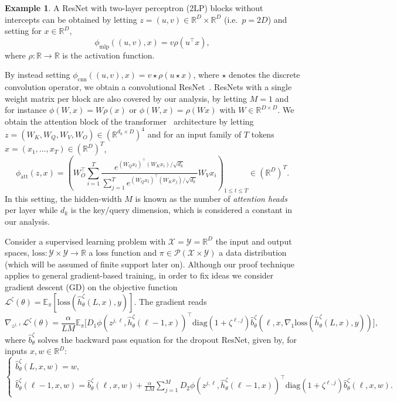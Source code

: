 \documentclass[a4paper,11pt]{article}
\newcommand{\R}{\mathbb{R}}
\newcommand{\1}{\mathbbm{1}}
\newcommand{\E}{\mathbb{E}}
\newcommand{\ps}{\mathcal{P}}
\renewcommand{\L}{\mathcal{L}}
\newcommand{\diag}{\mathrm{diag}}
\newcommand{\loss}{\mathrm{loss}}
\theoremstyle{definition}
\newtheorem{example}[theorem]{Example}
\theoremstyle{remark}
\begin{document}
\begin{example}\label{ex:classic_examples}
 A ResNet with two-layer perceptron (2LP) blocks without intercepts can be obtained by letting $z = (u,v) \in \R^D \times \R^D$ (i.e.~$p = 2D$) and setting for $x \in \R^D$, \[\phi_{\mathrm{mlp}}((u,v),x) = v \rho(u^\top x),\] where $\rho : \R \to \R$ is the activation function.
 
    By instead setting \(\phi_{\mathrm{cnn}}((u,v),x) = v \star \rho(u \star x)\), where $\star$ denotes the discrete convolution operator, we obtain a convolutional ResNet~\cite{he2015deepresiduallearningimage}.
    ResNets with a single weight matrix per block are also covered by our analysis, by letting $M = 1$ and for instance $\phi(W,x) = W \rho(x)$ or $\phi(W,x) = \rho(W x)$ with $W \in \R^{D \times D}$.
We obtain the attention block of the transformer~\cite{vaswani2017attention} architecture by letting $z = (W_K, W_Q, W_V, W_O) \in (\R^{d_k \times D})^4$ and for an input family of $T$ tokens $x = (x_1, \dots, x_T) \in (\R^D)^T$,
\begin{equation}
    \phi_{\mathrm{att}}(z,x) = \left( W_O^\top \sum_{i=1}^T \frac{e^{(W_Q x_t)^\top (W_K x_i)/\sqrt{d_k}}}{\sum_{j=1}^T e^{(W_Q x_t)^\top (W_K x_j)/\sqrt{d_k}}} W_V x_i \right)_{1 \le t \le T} \in (\R^D)^T.
\end{equation}
In this setting, the hidden-width $M$ is known as the number of \emph{attention heads} per layer while $d_k$ is the key/query dimension, which is considered a constant in our analysis.
\end{example}

Consider a supervised learning problem with
 $\mathcal{X}= \mathcal{Y} = \R^D$ the input and output spaces, $\loss: \mathcal{Y}\times\mathcal{Y} \to \R$ a loss function and $\pi\in \ps(\mathcal{X}\times\mathcal{Y})$ a data distribution (which will be assumed of finite support later on). 
Although our proof technique applies to general gradient-based training, in order to fix ideas we consider gradient descent (GD) on the objective function $\L^{\zeta}(\theta) = \E_{\pi}[\mathrm{loss}(\hat{h}_\theta^{\zeta}(L, x), y)]$. The gradient reads
\begin{equation}\label{eq:gradient_masked_resnet}
  \nabla_{z^{j,\ell}} \L^{\zeta}(\theta) = \frac{\alpha}{LM} \E_{\pi}\big[ {D_1\phi(z^{j,\ell},\hat{h}_\theta^{\zeta}(\ell-1, x))}^{\top} \diag(1+ \zeta^{\ell, j})\hat{b}_\theta^{\zeta}(\ell, x, \nabla_1 \mathrm{loss}(\hat{h}_\theta^{\zeta}(L, x), y))\big], 
\end{equation}
where $\hat{b}_\theta^{\zeta}$ solves the backward pass equation for the dropout ResNet, given by, for inputs $x, w\in \R^D$:
\begin{equation}\label{eq:backward_masked_resnet}
  \begin{cases}
    \hat{b}_\theta^{\zeta}(L, x, w) = w,\\
    \hat{b}_\theta^{\zeta}(\ell-1, x, w) = \hat{b}_\theta^{\zeta}(\ell, x, w) + \frac{\alpha}{LM}\sum_{j=1}^M {D_2\phi(z^{j,\ell}, \hat{h}_\theta^{\zeta}(\ell-1, x))}^{\top} \diag(1+ \zeta^{\ell, j})\hat{b}_\theta^{\zeta}(\ell, x, w).
\end{cases}
\end{equation}
\end{document}
